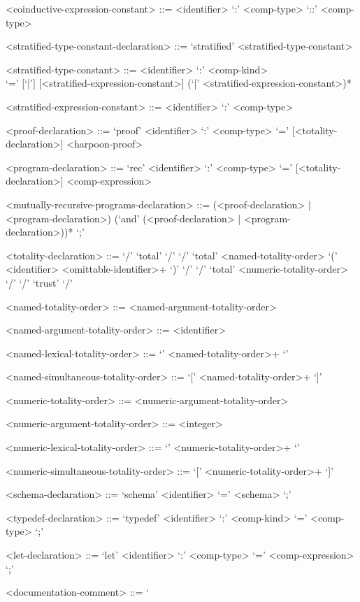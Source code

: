 \begin{grammar}
<coinductive-expression-constant> ::= <identifier> `:' <comp-type> `::' <comp-type>

<stratified-type-constant-declaration> ::= `stratified' <stratified-type-constant>

<stratified-type-constant> ::= <identifier> `:' <comp-kind>\\
`=' [`|'] [<stratified-expression-constant>] (`|' <stratified-expression-constant>)*

<stratified-expression-constant> ::= <identifier> `:' <comp-type>

<proof-declaration> ::= `proof' <identifier> `:' <comp-type> `=' [<totality-declaration>] <harpoon-proof>

<program-declaration> ::= `rec' <identifier> `:' <comp-type> `=' [<totality-declaration>] <comp-expression>

<mutually-recursive-programs-declaration> ::= (<proof-declaration> | <program-declaration>) (`and' (<proof-declaration> | <program-declaration>))* `;'

<totality-declaration> ::= `/' `total' `/'
\alt `/' `total' <named-totality-order> `(' <identifier> <omittable-identifier>+ `)' `/'
\alt `/' `total' <numeric-totality-order> `/'
\alt `/' `trust' `/'

<named-totality-order> ::= <named-argument-totality-order>

<named-argument-totality-order> ::= <identifier>

<named-lexical-totality-order> ::= `{' <named-totality-order>+ `}'

<named-simultaneous-totality-order> ::= `[' <named-totality-order>+ `]'

<numeric-totality-order> ::= <numeric-argument-totality-order>

<numeric-argument-totality-order> ::= <integer>

<numeric-lexical-totality-order> ::= `{' <numeric-totality-order>+ `}'

<numeric-simultaneous-totality-order> ::= `[' <numeric-totality-order>+ `]'

<schema-declaration> ::= `schema' <identifier> `=' <schema> `;'

<typedef-declaration> ::= `typedef' <identifier> `:' <comp-kind> `=' <comp-type> `;'

<let-declaration> ::= `let' <identifier> `:' <comp-type> `=' <comp-expression> `;'

<documentation-comment> ::= `%
\end{grammar}

